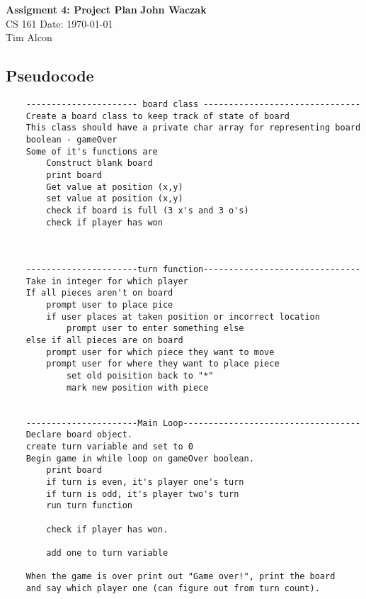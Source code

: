 \documentclass[a4paper, 11pt]{article}
\begin{document}
\noindent
\large\textbf{Assigment 4: Project Plan} \hfill \textbf{John Waczak} \\
\normalsize CS 161 \hfill  Date: \today \\
Tim Alcon \\


\subsection*{Pseudocode} 

\begin{lstlisting}
	---------------------- board class ------------------------------- 
	Create a board class to keep track of state of board
	This class should have a private char array for representing board
	boolean - gameOver
	Some of it's functions are
		Construct blank board
		print board 
		Get value at position (x,y) 
		set value at position (x,y) 
		check if board is full (3 x's and 3 o's)
		check if player has won 
		
		
		
	----------------------turn function-------------------------------	
	Take in integer for which player
	If all pieces aren't on board 
		prompt user to place pice 
		if user places at taken position or incorrect location 
			prompt user to enter something else 
	else if all pieces are on board
		prompt user for which piece they want to move
		prompt user for where they want to place piece 
			set old poisition back to "*" 
			mark new position with piece
		
		
	----------------------Main Loop-----------------------------------
	Declare board object. 
	create turn variable and set to 0
	Begin game in while loop on gameOver boolean. 
		print board 
		if turn is even, it's player one's turn 
		if turn is odd, it's player two's turn 
		run turn function 
		
		check if player has won.
		
		add one to turn variable 
		
	When the game is over print out "Game over!", print the board 
	and say which player one (can figure out from turn count). 
	
\end{lstlisting}
\end{document}
